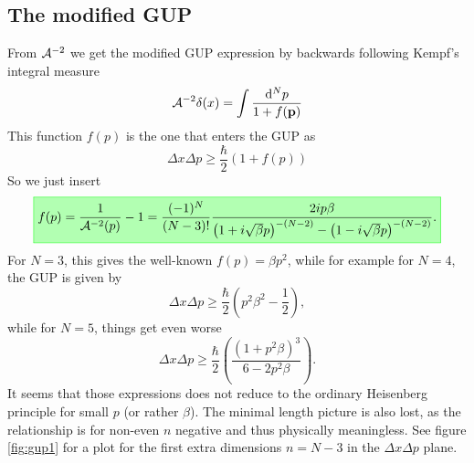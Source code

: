 \documentclass[10pt,a4paper]{article}
\newcommand{\highlight}[1]{%
   \fcolorbox{green}{green!30}{$\displaystyle#1$}%
}
\begin{document}
\subsection{The modified GUP}
From ${\cal A}^{-2}$ we get the modified GUP expression by backwards following Kempf's integral measure
\begin{equation}
{\cal A}^{-2} \delta(x) = \int \frac{\mathrm{d}^N p}{1 + f(\mathbf{ p })}
\end{equation}
This function $f(p)$ is the one that enters the GUP as
\begin{equation}
\Delta x \Delta p \geq \frac \hbar2 (1 + f(p))
\end{equation}
So we just insert
\begin{equation}
\highlight{
f(p) = \frac 1{\C A^{-2}(p)} - 1
=
\frac{(-1)^N}{(N-3)!}
\frac{2 i p \beta}{\left(1+i\sqrt{\beta} p\right)^{-(N-2)} - \left(1-i\sqrt{\beta} p\right)^{-(N-2)} }.
}%
\end{equation}
For $N=3$, this gives the well-known $f(p)=\beta p^2$, while for example for $N=4$, the GUP is given by
\begin{equation}
\Delta x \Delta p \geq \frac{\hbar}2 \left(
p^2 \beta^2 - \frac{1}{2}
\right),
\end{equation}
while for $N=5$, things get even worse
\begin{equation}
\Delta x \Delta p \geq \frac \hbar2 \left(
\frac{(1 + p^2 \beta)^3}{6 - 2 p^2 \beta}
\right).
\end{equation}
It seems that those expressions does not reduce to the ordinary Heisenberg principle for small $p$ (or rather $\beta$). The minimal length picture is also lost, as the relationship is for non-even $n$ negative and thus physically meaningless. See  figure \ref{fig:gup1} for a plot for the first extra dimensions $n=N-3$ in the $\Delta x \Delta p$ plane.

\newpage
\end{document}
